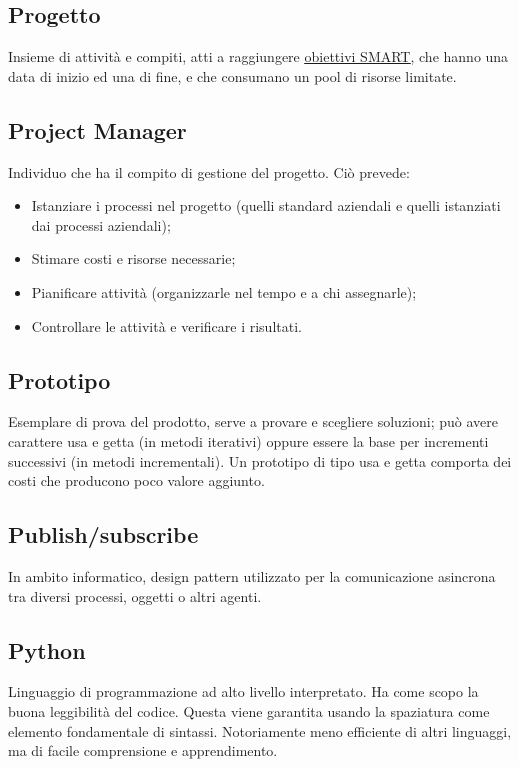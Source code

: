	\subsection{Progetto}
	\label{sec:progetto}
	Insieme di attività e compiti, atti a raggiungere \underline{\hyperref[sec:smart]{obiettivi SMART}}, che hanno una data di inizio ed una di fine, e che consumano un pool di risorse limitate.

	\subsection{Project Manager}
	\label{sec:projectmanager}
	Individuo che ha il compito di gestione del progetto. Ciò prevede:
	\begin{itemize}
	\item Istanziare i processi nel progetto (quelli standard aziendali e quelli istanziati dai processi aziendali);
	\item Stimare costi e risorse necessarie;
	\item Pianificare attività (organizzarle nel tempo e a chi assegnarle);
	\item Controllare le attività e verificare i risultati.
	\end{itemize}

	\subsection{Prototipo}
	\label{sec:prototipo}
	Esemplare di prova del prodotto, serve a provare e scegliere soluzioni; può avere carattere usa e getta (in metodi iterativi) oppure essere la base per incrementi successivi (in metodi incrementali).
	Un prototipo di tipo usa e getta comporta dei costi che producono poco valore aggiunto.\newpage
	\subsection{Publish/subscribe}
\label{sec:pubsub}
In ambito informatico, design pattern utilizzato per la comunicazione asincrona tra diversi processi, oggetti o altri agenti.

\subsection{Python}
Linguaggio di programmazione ad alto livello interpretato. Ha come scopo la buona leggibilità del codice. Questa viene garantita usando la spaziatura come elemento fondamentale di sintassi. Notoriamente meno efficiente di altri linguaggi, ma di facile comprensione e apprendimento.

